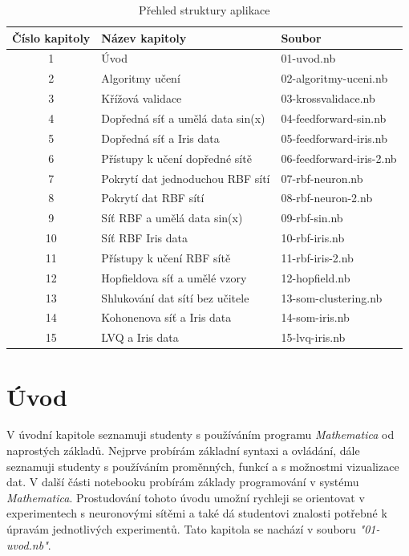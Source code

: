 \documentclass[11pt,twoside,a4paper]{book}
\begin{document}
\begin{center}
\begin{table}[h]
\begin{tabular}{|c|l|l|}
\hline 
Číslo kapitoly & Název kapitoly & Soubor \\ \hline
1 & Úvod & 01-uvod.nb \\ \hline
2 & Algoritmy učení & 02-algoritmy-uceni.nb \\ \hline
3 & Křížová validace & 03-krossvalidace.nb \\ \hline
4 & Dopředná síť a umělá data sin(x) & 04-feedforward-sin.nb \\ \hline
5 & Dopředná síť a Iris data & 05-feedforward-iris.nb \\ \hline
6 & Přístupy k učení dopředné sítě & 06-feedforward-iris-2.nb \\ \hline
7 & Pokrytí dat jednoduchou RBF sítí & 07-rbf-neuron.nb \\ \hline
8 & Pokrytí dat RBF sítí & 08-rbf-neuron-2.nb \\ \hline
9 & Síť RBF a umělá data sin(x) & 09-rbf-sin.nb \\ \hline
10 & Síť RBF  Iris data & 10-rbf-iris.nb \\ \hline
11 & Přístupy k učení RBF sítě & 11-rbf-iris-2.nb \\ \hline
12 & Hopfieldova síť a umělé vzory & 12-hopfield.nb \\ \hline
13 & Shlukování dat sítí bez učitele & 13-som-clustering.nb \\ \hline
14 & Kohonenova síť a Iris data & 14-som-iris.nb \\ \hline
15 & LVQ a Iris data & 15-lvq-iris.nb \\ \hline
\end{tabular}
\caption{Přehled struktury aplikace}
\end{table}
\end{center}

\section{Úvod}
V úvodní kapitole seznamuji studenty s používáním programu \textit{Mathematica} od naprostých základů. Nejprve probírám základní syntaxi a ovládání, dále seznamuji studenty s používáním proměnných, funkcí a s možnostmi vizualizace dat. V další části notebooku probírám základy programování v systému \textit{Mathematica}. Prostudování tohoto úvodu umožní rychleji se orientovat v experimentech s neuronovými sítěmi a také dá studentovi znalosti potřebné k úpravám jednotlivých experimentů. Tato kapitola se nachází v souboru \textit{"01-uvod.nb"}.
\end{document}
